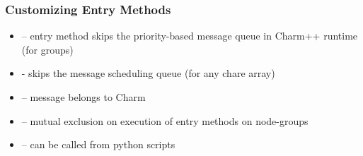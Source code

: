 \begin{frame}[fragile]
  \frametitle{Customizing Entry Methods}
  \begin{itemize}
    \item {} – entry method skips the priority-based message queue in Charm++ runtime (for groups)
    \item {} - skips the message scheduling queue (for any chare array)
    \item {} – message belongs to Charm
    \item {} – mutual exclusion on execution of entry methods on node-groups 
    \item {} – can be called from python scripts
  \end{itemize}
\end{frame}

